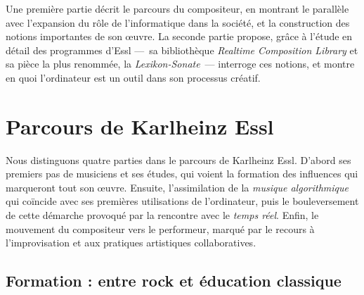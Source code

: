 \documentclass[a4paper,12pt]{article}
\newcommand{\guill}[1]{«~#1~»}
\newcommand{\zitat}[2]{\#Citation(#2)\#}
\begin{document}

Une première partie décrit le parcours du compositeur, en montrant le parallèle avec l'expansion du rôle de l'informatique dans la société, et la construction des notions importantes de son œuvre. La seconde partie propose, grâce à l'étude en détail des programmes d'Essl ---~sa bibliothèque \emph{Realtime Composition Library} et sa pièce la plus renommée, la \emph{Lexikon-Sonate}~--- interroge ces notions, et montre en quoi l'ordinateur est un outil dans son processus créatif.

\section{Parcours de Karlheinz Essl}

Nous distinguons quatre parties dans le parcours de Karlheinz Essl. D'abord ses premiers pas de musiciens et ses études, qui voient la formation des influences qui marqueront tout son œuvre. Ensuite, l'assimilation de la \emph{musique algorithmique} qui coïncide avec ses premières utilisations de l'ordinateur, puis le bouleversement de cette démarche provoqué par la rencontre avec le \emph{temps réel}. Enfin, le mouvement du compositeur vers le performeur, marqué par le recours à l'improvisation et aux pratiques artistiques collaboratives.

\subsection{Formation : entre rock et éducation classique}
\end{document}
